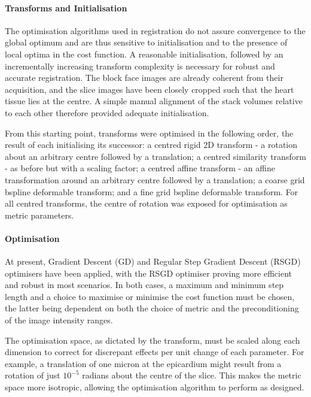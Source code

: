     
      \paragraph{Transforms and Initialisation}
        The optimisation algorithms used in registration do not assure convergence to the global optimum and are thus sensitive to initialisation and to the presence of local optima in the cost function. A reasonable initialisation, followed by an incrementally increasing transform complexity is necessary for robust and accurate registration. The block face images are already coherent from their acquisition, and the slice images have been closely cropped such that the heart tissue lies at the centre. A simple manual alignment of the stack volumes relative to each other therefore provided adequate initialisation.

        From this starting point, transforms were optimised in the following order, the result of each initialising its successor: a centred rigid 2D transform - a rotation about an arbitrary centre followed by a translation; a centred similarity transform - as before but with a scaling factor; a centred affine transform - an affine transformation around an arbitrary centre followed by a translation; a coarse grid bspline deformable transform; and a fine grid bspline deformable transform. For all centred transforms, the centre of rotation was exposed for optimisation as metric parameters.

      \paragraph{Optimisation}
      At present, Gradient Descent (GD) and Regular Step Gradient Descent (RSGD) optimisers have been applied, with the RSGD optimiser proving more efficient and robust in most scenarios. In both cases, a maximum and minimum step length and a choice to maximise or minimise the cost function must be chosen, the latter being dependent on both the choice of metric and the preconditioning of the image intensity ranges.

      The optimisation space, as dictated by the transform, must be scaled along each dimension to correct for discrepant effects per unit change of each parameter. For example, a translation of one micron at the epicardium might result from a rotation of just $10^{-5}$ radians about the centre of the slice. This makes the metric space more isotropic, allowing the optimisation algorithm to perform as designed.

